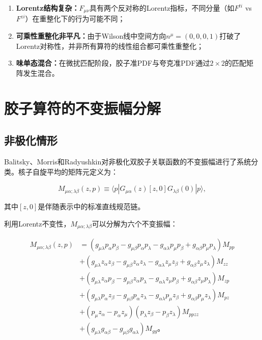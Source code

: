 \documentclass[12pt,a4paper]{ctexart}
\theoremstyle{definition}
\begin{document}
\begin{enumerate}
    \item \textbf{Lorentz结构复杂：}$F_{\mu\nu}$具有两个反对称的Lorentz指标，不同分量（如$F^{ti}$ vs $F^{zi}$）在重整化下的行为可能不同；
    \item \textbf{可乘性重整化非平凡：}由于Wilson线中空间方向$n^\mu = (0,0,0,1)$打破了Lorentz对称性，并非所有算符的线性组合都可乘性重整化；
    \item \textbf{味单态混合：}在微扰匹配阶段，胶子准PDF与夸克准PDF通过$2 \times 2$的匹配矩阵发生混合。
\end{enumerate}

\section{胶子算符的不变振幅分解}

\subsection{非极化情形}

Balitsky、Morris和Radyushkin\cite{Balitsky2020}对非极化双胶子关联函数的不变振幅进行了系统分类。核子自旋平均的矩阵元定义为：

\begin{equation}
M_{\mu\alpha;\lambda\beta}(z, p) \equiv \langle p| G_{\mu\alpha}(z) [z, 0] G_{\lambda\beta}(0) |p\rangle,
\label{eq:M_def}
\end{equation}

其中$[z,0]$是伴随表示中的标准直线规范链。

利用Lorentz不变性，$M_{\mu\alpha;\lambda\beta}$可以分解为六个不变振幅\cite{Balitsky2020}：

\begin{equation}
\begin{aligned}
M_{\mu\alpha;\lambda\beta}(z, p) &=
(g_{\mu\lambda}p_\alpha p_\beta - g_{\mu\beta}p_\alpha p_\lambda - g_{\alpha\lambda}p_\mu p_\beta + g_{\alpha\beta}p_\mu p_\lambda) M_{pp} \\
&+ (g_{\mu\lambda}z_\alpha z_\beta - g_{\mu\beta}z_\alpha z_\lambda - g_{\alpha\lambda}z_\mu z_\beta + g_{\alpha\beta}z_\mu z_\lambda) M_{zz} \\
&+ (g_{\mu\lambda}z_\alpha p_\beta - g_{\mu\beta}z_\alpha p_\lambda - g_{\alpha\lambda}z_\mu p_\beta + g_{\alpha\beta}z_\mu p_\lambda) M_{zp} \\
&+ (g_{\mu\lambda}p_\alpha z_\beta - g_{\mu\beta}p_\alpha z_\lambda - g_{\alpha\lambda}p_\mu z_\beta + g_{\alpha\beta}p_\mu z_\lambda) M_{pz} \\
&+ (p_\mu z_\alpha - p_\alpha z_\mu)(p_\lambda z_\beta - p_\beta z_\lambda) M_{ppzz} \\
&+ (g_{\mu\lambda}g_{\alpha\beta} - g_{\mu\beta}g_{\alpha\lambda}) M_{gg}。
\end{aligned}
\label{eq:invariant_amplitudes}
\end{equation}
\end{document}
